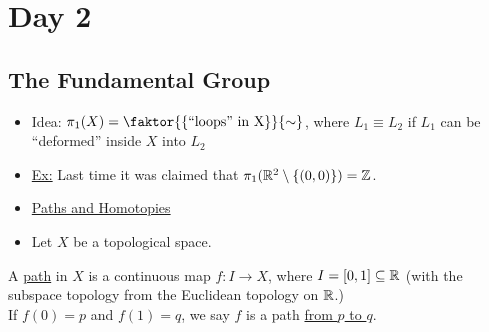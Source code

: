 \documentclass[../notes.tex]{subfiles}
\begin{document}
\section{Day 2}
\subsection{The Fundamental Group}
    \begin{itemize}
        \item Idea: $\pi_1(X)=\faktor{\{\text{``loops'' in X}\}}{\sim}$, where $L_1 \equiv L_2$ if $L_1$ can be ``deformed'' inside $X$
            into $L_2$
        \item \underline{Ex:} Last time it was claimed that $\pi_1(\mathbb{R}^2\setminus \{(0,0)\})=\mathbb{Z}$.
        \item\underline{Paths and Homotopies}
        \item Let $X$ be a topological space.
    \end{itemize}
        \begin{definition}
            A \underline{path} in $X$ is a continuous map $f:I \rightarrow X$, where $I=[0,1]\subseteq \mathbb{R}$ (with the
            subspace topology from the Euclidean topology on $\mathbb{R}$.)\\
            If $f(0)=p$ and $f(1)=q$, we say $f$ is a path \underline{from $p$ to $q$}.
        \end{definition}
\end{document}
